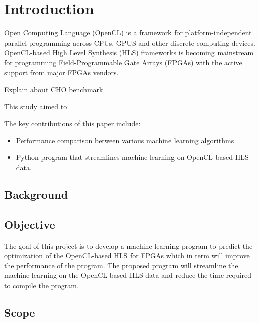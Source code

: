 \chapter{Introduction}
Open Computing Language (OpenCL) \citep{opencl} is a framework for platform-independent parallel programming across CPUs, GPUS and other discrete computing devices. OpenCL-based High Level Synthesis (HLS) frameworks is becoming mainstream for programming Field-Programmable Gate Arrays (FPGAs) with the active support from major FPGAs vendors. \citep{rich2015how}

Explain about CHO benchmark

This study aimed to 

The key contributions of this paper include:
\begin{itemize}
    \item Performance comparison between various machine learning algorithms
    \item Python program that streamlines machine learning on OpenCL-based HLS data.
\end{itemize}

\section{Background}


\section{Objective}
The goal of this project is to develop a machine learning program to predict the optimization of the OpenCL-based HLS for FPGAs which in term will improve the performance of the program. The proposed program will streamline the machine learning on the OpenCL-based HLS data and reduce the time required to compile the program.

\section{Scope}
